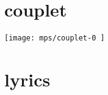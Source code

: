 \documentclass[11pt]{article}
\begin{document}
    \makesongtitle
\section*{couplet}
      \texttt{[image:  mps/couplet-0 ]}

\newpage


\section*{lyrics}
\begin{multicols}{2}

\end{multicols}
\end{document}
